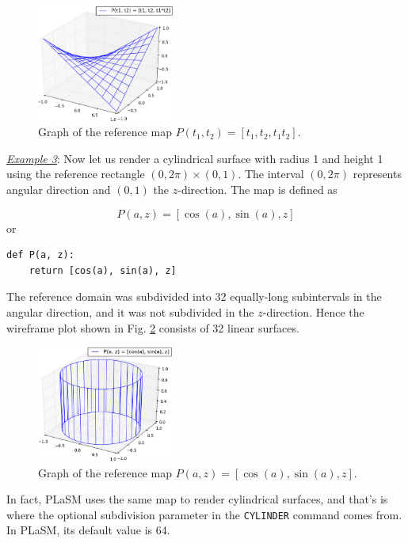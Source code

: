 \begin{figure}[!ht]
\begin{center}
\includegraphics[width=0.4\textwidth]{img/paramsu1c.png}
\end{center}
\vspace{-6mm}
\caption{Graph of the reference map $P(t_1, t_2) = [t_1, t_2, t_1 t_2]$.}
\label{fig:paramsu1c}
\end{figure}
\noindent
\noindent
\underline{\em Example 3}: Now let us render a cylindrical surface 
with radius 1 and height 1 using the reference rectangle $(0, 2\pi)\times(0, 1)$. 
The interval $(0, 2\pi)$ represents angular direction and $(0, 1)$ the $z$-direction. 
The map is defined as

$$
P(a, z) = [\cos(a), \sin(a), z]
$$
or\\

\begin{bbox}
\begin{verbatim}
def P(a, z):
    return [cos(a), sin(a), z]
\end{verbatim}
\end{bbox}
\vspace{6mm}

\noindent
The reference domain was subdivided into 32 equally-long subintervals in the angular direction,
and it was not subdivided in the $z$-direction. Hence the wireframe plot shown in 
Fig. \ref{fig:paramsu20} consists of 32 linear surfaces. 
\newpage
\begin{figure}[!ht]
\begin{center}
\includegraphics[width=0.4\textwidth]{img/paramsu20.png}
\end{center}
\vspace{-6mm}
\caption{Graph of the reference map $P(a, z) = [\cos(a), \sin(a), z]$.}
\label{fig:paramsu20}
\end{figure}
\noindent
In fact, PLaSM uses the same map to render cylindrical surfaces, and that's
is where the optional subdivision parameter in the {\tt CYLINDER} command comes from.
In PLaSM, its default value is 64. 

